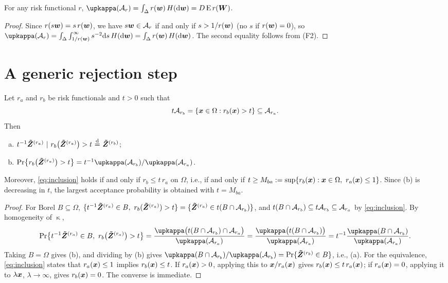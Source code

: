 \documentclass[12pt]{article}
\let\amsfrac\frac
\let\frac\amsfrac
\newcommand{\Zr}[1]{\bm{\tilde Z}^{(#1)}}
\newcommand{\bW}{\bm W}
\begin{document}
\begin{lemma}\label{lem:normconst}
For any risk functional $r$, $\upkappa(\calA_r)=\int_\Delta r(\bw)\,H(\text d\bw)=D\,\E\, r(\bW)$.
\end{lemma}

\begin{proof}
Since $r(s{\boldsymbol{w}})=s\,r({\boldsymbol{w}})$, we have $s{\boldsymbol{w}}\in{\mathcal A}_r$ if and only if $s>1/r({\boldsymbol{w}})$ (no $s$ if $r({\boldsymbol{w}})=0$), so $\upkappa(\calA_r)=\int_\Delta\int_{1/r(\bw)}^\infty s^{-2}\text ds\,H(\text d\bw)=\int_\Delta r(\bw)\,H(\text d\bw)$. The second equality follows from (F2).
\end{proof}

\section{A generic rejection step}

\begin{lemma}\label{lem:generic}
Let $r_a$ and $r_b$ be risk functionals and $t>0$ such that
\begin{equation}\label{eq:inclusion}
t{\mathcal A}_{r_b}=\{{\boldsymbol{x}}\in\Omega:r_b({\boldsymbol{x}})>t\}\subseteq{\mathcal A}_{r_a}.
\end{equation}
Then
\begin{enumerate}[(a)]
\item $t^{-1}\Zr{r_a}\ |\ r_b\big(\Zr{r_a}\big)>t\ \eqd\ \Zr{r_b}$;
\item $\Pr\big\{r_b\big(\Zr{r_a}\big)>t\big\}=t^{-1}\upkappa(\calA_{r_b})/\upkappa(\calA_{r_a})$.
\end{enumerate}
Moreover, \eqref{eq:inclusion} holds if and only if $r_b\leq t\,r_a$ on $\Omega$, i.e., if and only if $t\geq M_{ba}:=\sup\{r_b({\boldsymbol{x}}):{\boldsymbol{x}}\in\Omega,\ r_a({\boldsymbol{x}})\leq1\}$. Since (b) is decreasing in $t$, the largest acceptance probability is obtained with $t=M_{ba}$.
\end{lemma}

\begin{proof}
For Borel $B\subseteq\Omega$, $\{t^{-1}\Zr{r_a}\in B,\ r_b(\Zr{r_a})>t\}=\{\Zr{r_a}\in t(B\cap\calA_{r_b})\}$, and $t(B\cap{\mathcal A}_{r_b})\subseteq t{\mathcal A}_{r_b}\subseteq{\mathcal A}_{r_a}$ by \eqref{eq:inclusion}. By homogeneity of $\upkappa$,
$$
\Pr\big\{t^{-1}\Zr{r_a}\in B,\ r_b\big(\Zr{r_a}\big)>t\big\}
=\frac{\upkappa\big(t(B\cap\calA_{r_b})\cap\calA_{r_a}\big)}{\upkappa(\calA_{r_a})}
=\frac{\upkappa\big(t(B\cap\calA_{r_b})\big)}{\upkappa(\calA_{r_a})}
=t^{-1}\frac{\upkappa(B\cap\calA_{r_b})}{\upkappa(\calA_{r_a})}.
$$
Taking $B=\Omega$ gives (b), and dividing by (b) gives $\upkappa(B\cap\calA_{r_b})/\upkappa(\calA_{r_b})=\Pr\{\Zr{r_b}\in B\}$, i.e., (a).
For the equivalence, \eqref{eq:inclusion} states that $r_a({\boldsymbol{x}})\leq1$ implies $r_b({\boldsymbol{x}})\leq t$. If $r_a({\boldsymbol{x}})>0$, applying this to ${\boldsymbol{x}}/r_a({\boldsymbol{x}})$ gives $r_b({\boldsymbol{x}})\leq t\,r_a({\boldsymbol{x}})$; if $r_a({\boldsymbol{x}})=0$, applying it to $\lambda{\boldsymbol{x}}$, $\lambda\to\infty$, gives $r_b({\boldsymbol{x}})=0$. The converse is immediate.
\end{proof}
\end{document}
